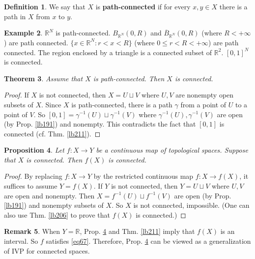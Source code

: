 \documentclass[12pt,b5paper,notitlepage]{article}
\theoremstyle{definition}
\newtheorem{df}{Definition}[section]
\newtheorem{eg}[df]{Example}
\newtheorem{rem}[df]{Remark}
\theoremstyle{plain}
\newtheorem{thm}[df]{Theorem}
\newtheorem{pp}[df]{Proposition}
\newcommand{\ovl}{\overline}
\newcommand{\Rbb}{\mathbb R}
\numberwithin{equation}{section}
\begin{document}
\begin{df}
We say that $X$ is \textbf{path-connected}  if for every $x,y\in X$ there is a path in $X$ from $x$ to $y$.
\end{df}


\begin{eg}
$\Rbb^N$ is path-connected. $B_{\Rbb^N}(0,R)$ and $\ovl B_{\Rbb^N}(0,R)$ (where $R<+\infty$) are path connected. $\{x\in \Rbb^N:r<x<R\}$ (where $0\leq r<R<+\infty$) are path connected. The region enclosed by a triangle is a connected subset of $\Rbb^2$. $[0,1]^N$ is connected.
\end{eg}

\begin{thm}\label{lb220}
Assume that $X$ is path-connected. Then $X$ is connected.
\end{thm}

\begin{proof}
If $X$ is not connected, then $X=U\sqcup V$ where $U,V$ are nonempty open subsets of $X$. Since $X$ is path-connected, there is a path $\gamma$ from a point of $U$ to a point of $V$. So $[0,1]=\gamma^{-1}(U)\sqcup\gamma^{-1}(V)$ where $\gamma^{-1}(U),\gamma^{-1}(V)$ are open (by Prop. \ref{lb191}) and nonempty. This contradicts the fact that $[0,1]$ is connected (cf. Thm. \ref{lb211}).
\end{proof}



\begin{pp}\label{lb210}
Let $f:X\rightarrow Y$ be a continuous map of topological spaces. Suppose that $X$ is connected. Then $f(X)$ is connected.
\end{pp}

\begin{proof}
By replacing $f:X\rightarrow Y$ by the restricted continuous map $f:X\rightarrow f(X)$, it suffices to assume $Y=f(X)$. If $Y$ is not connected, then $Y=U\sqcup V$ where $U,V$ are open and nonempty. Then $X=f^{-1}(U)\sqcup f^{-1}(V)$ are open (by Prop. \ref{lb191}) and nonempty subsets of $X$. So $X$ is not connected, impossible. (One can also use Thm. \ref{lb206} to prove that $f(X)$ is connected.)
\end{proof}

\begin{rem}
When $Y=\Rbb$, Prop. \ref{lb210} and Thm. \ref{lb211} imply that $f(X)$ is an interval. So $f$ satisfies \eqref{eq67}. Therefore, Prop. \ref{lb210} can be viewed as a generalization of IVP for connected spaces.
\end{rem}
\end{document}
